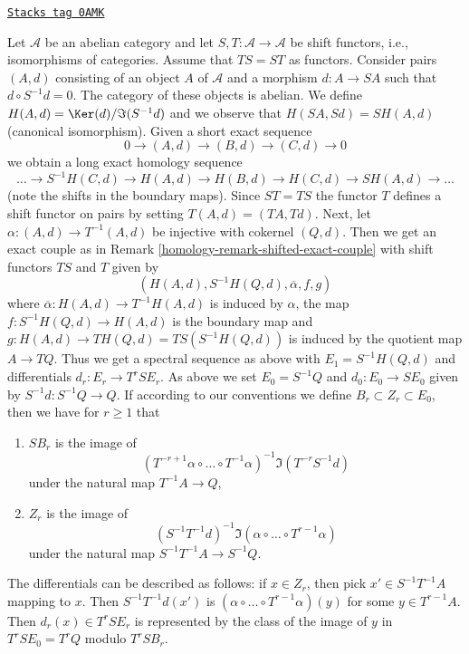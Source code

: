 \begin{remark}[Variant]

\label{homology-remark-differential-object-selfmap}
\href{https://stacks.math.columbia.edu/tag/0AMK}{\texttt{Stacks tag 0AMK}}

Let $\mathcal{A}$ be an abelian category and let
$S, T : \mathcal{A} \to \mathcal{A}$ be shift functors, i.e.,
isomorphisms of categories. Assume that $TS = ST$ as functors.
Consider pairs $(A, d)$ consisting of an object $A$ of $\mathcal{A}$
and a morphism $d : A \to SA$ such that $d \circ S^{-1}d = 0$.
The category of these objects is abelian.
We define $H(A, d) = \Ker(d)/\Im(S^{-1}d)$ and we observe that
$H(SA, Sd) = SH(A, d)$ (canonical isomorphism).
Given a short exact sequence
$$
0 \to (A, d) \to (B, d) \to (C, d) \to 0
$$
we obtain a long exact homology sequence
$$
\ldots \to S^{-1}H(C, d) \to
H(A, d) \to H(B, d) \to H(C, d) \to SH(A, d) \to \ldots
$$
(note the shifts in the boundary maps). Since $ST = TS$ the functor
$T$ defines a shift functor on pairs by setting $T(A, d) = (TA, Td)$.
Next, let $\alpha : (A, d) \to T^{-1}(A, d)$ be injective with
cokernel $(Q, d)$. Then we get an exact couple as in
Remark \ref{homology-remark-shifted-exact-couple} with shift functors $TS$ and
$T$ given by
$$
(H(A, d), S^{-1}H(Q, d), \overline{\alpha}, f, g)
$$
where $\overline{\alpha} : H(A, d) \to T^{-1}H(A, d)$ is induced by $\alpha$,
the map $f : S^{-1}H(Q, d) \to H(A, d)$ is the boundary
map and $g : H(A, d) \to TH(Q, d) = TS(S^{-1}H(Q, d))$ is induced by
the quotient map $A \to TQ$. Thus we get a spectral sequence as above
with $E_1 = S^{-1}H(Q, d)$ and differentials $d_r : E_r \to T^rSE_r$.
As above we set $E_0 = S^{-1}Q$ and $d_0 : E_0 \to SE_0$ given by
$S^{-1}d : S^{-1}Q \to Q$. If according to our conventions we define
$B_r \subset Z_r \subset E_0$, then we have for $r \geq 1$ that
\begin{enumerate}
\item $SB_r$ is the image of
$$
(T^{-r + 1}\alpha \circ \ldots \circ T^{-1}\alpha)^{-1}
\Im(T^{-r}S^{-1}d)
$$
under the natural map $T^{-1}A \to Q$,
\item $Z_r$ is the image of
$$
(S^{-1}T^{-1}d)^{-1}
\Im(\alpha \circ \ldots \circ T^{r - 1}\alpha)
$$
under the natural map $S^{-1}T^{-1}A \to S^{-1}Q$.
\end{enumerate}
The differentials can be described as follows: if $x \in Z_r$, then
pick $x' \in S^{-1}T^{-1}A$ mapping to $x$. Then $S^{-1}T^{-1}d(x')$
is $(\alpha \circ \ldots \circ T^{r - 1}\alpha)(y)$ for some
$y \in T^{r - 1}A$. Then $d_r(x) \in T^rSE_r$ is represented by the
class of the image of $y$ in $T^rSE_0 = T^rQ$ modulo $T^rSB_r$.
\end{remark}

